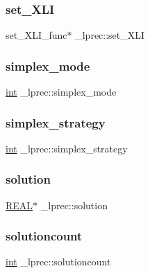 \subsubsection{\texorpdfstring{set\+\_\+\+X\+LI}{set\_XLI}}
{\footnotesize\ttfamily set\+\_\+\+X\+L\+I\+\_\+func$\ast$ \+\_\+lprec\+::set\+\_\+\+X\+LI}

\mbox{\label{struct__lprec_ab9863b7d00c6d8946788db4b318ee070}} 
\subsubsection{\texorpdfstring{simplex\+\_\+mode}{simplex\_mode}}
{\footnotesize\ttfamily \hyperlink{lp__lib_8h_adeb9ec6400320e4923ac9d836d509ddb}{int} \+\_\+lprec\+::simplex\+\_\+mode}

\mbox{\label{struct__lprec_a84a3bfcacf0e6286d031100f7ace58da}} 
\subsubsection{\texorpdfstring{simplex\+\_\+strategy}{simplex\_strategy}}
{\footnotesize\ttfamily \hyperlink{lp__lib_8h_adeb9ec6400320e4923ac9d836d509ddb}{int} \+\_\+lprec\+::simplex\+\_\+strategy}

\mbox{\label{struct__lprec_a9faeb28b7a309c8cd87da65a49ddd1a2}} 
\subsubsection{\texorpdfstring{solution}{solution}}
{\footnotesize\ttfamily \hyperlink{lp__lib_8h_a92bd5e363d131fa73669358edb232dce}{R\+E\+AL}$\ast$ \+\_\+lprec\+::solution}

\mbox{\label{struct__lprec_a725ba19eff620bba7f487a69165759c6}} 
\subsubsection{\texorpdfstring{solutioncount}{solutioncount}}
{\footnotesize\ttfamily \hyperlink{lp__lib_8h_adeb9ec6400320e4923ac9d836d509ddb}{int} \+\_\+lprec\+::solutioncount}


